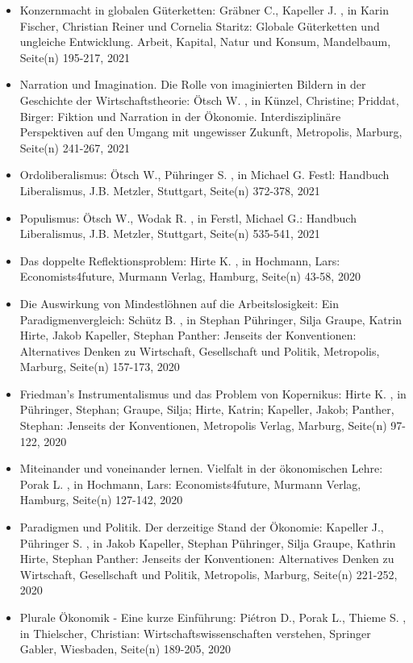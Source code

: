 \begin{itemize}
\item Konzernmacht in globalen Güterketten: Gräbner C., Kapeller J. , in Karin Fischer, Christian Reiner und Cornelia Staritz: Globale Güterketten und ungleiche Entwicklung. Arbeit, Kapital, Natur und Konsum, Mandelbaum, Seite(n) 195-217, 2021
\item Narration und Imagination. Die Rolle von imaginierten Bildern in der Geschichte der Wirtschaftstheorie: Ötsch W. , in Künzel, Christine; Priddat, Birger: Fiktion und Narration in der Ökonomie. Interdisziplinäre Perspektiven auf den Umgang mit ungewisser Zukunft, Metropolis, Marburg, Seite(n) 241-267, 2021
\item Ordoliberalismus: Ötsch W., Pühringer S. , in Michael G. Festl: Handbuch Liberalismus, J.B. Metzler, Stuttgart, Seite(n) 372-378, 2021
\item Populismus: Ötsch W., Wodak R. , in Ferstl, Michael G.: Handbuch Liberalismus, J.B. Metzler, Stuttgart, Seite(n) 535-541, 2021
\item Das doppelte Reflektionsproblem: Hirte K. , in Hochmann, Lars: Economists4future, Murmann Verlag, Hamburg, Seite(n) 43-58, 2020
\item Die Auswirkung von Mindestlöhnen auf die Arbeitslosigkeit: Ein Paradigmenvergleich: Schütz B. , in Stephan Pühringer, Silja Graupe, Katrin Hirte, Jakob Kapeller, Stephan Panther: Jenseits der Konventionen: Alternatives Denken zu Wirtschaft, Gesellschaft und Politik, Metropolis, Marburg, Seite(n) 157-173, 2020
\item Friedman’s Instrumentalismus und das Problem von Kopernikus: Hirte K. , in Pühringer, Stephan; Graupe, Silja; Hirte, Katrin; Kapeller, Jakob; Panther, Stephan: Jenseits der Konventionen, Metropolis Verlag, Marburg, Seite(n) 97-122, 2020
\item Miteinander und voneinander lernen. Vielfalt in der ökonomischen Lehre: Porak L. , in Hochmann, Lars: Economists4future, Murmann Verlag, Hamburg, Seite(n) 127-142, 2020
\item Paradigmen und Politik. Der derzeitige Stand der Ökonomie: Kapeller J., Pühringer S. , in Jakob Kapeller, Stephan Pühringer, Silja Graupe, Kathrin Hirte, Stephan Panther: Jenseits der Konventionen: Alternatives Denken zu Wirtschaft, Gesellschaft und Politik, Metropolis, Marburg, Seite(n) 221-252, 2020
\item Plurale Ökonomik - Eine kurze Einführung: Piétron D., Porak L., Thieme S. , in Thielscher, Christian: Wirtschaftswissenschaften verstehen, Springer Gabler, Wiesbaden, Seite(n) 189-205, 2020

\end{itemize}
